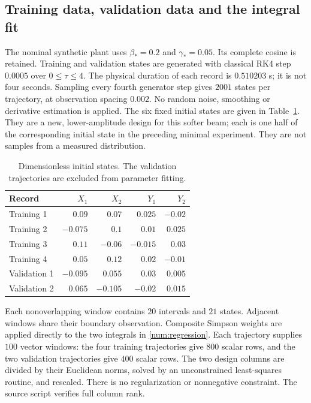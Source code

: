 \subsection{Training data, validation data and the integral fit}
\label{sx:training}
The nominal synthetic plant uses $\beta_*=0.2$ and $\gamma_*=0.05$.
Its complete cosine is retained. Training and validation states are
generated with classical RK4 step $0.0005$ over $0\leq\tau\leq4$.
The physical duration of each record is $0.510203$ s;
it is not four seconds. Sampling every fourth generator step gives
$2001$ states per trajectory, at observation spacing $0.002$.
No random noise, smoothing or derivative estimation is applied.
The six fixed initial states are given in Table~\ref{sx:initial-states}.
They are a new, lower-amplitude design for this softer beam; each is
one half of the corresponding initial state in the preceding minimal
experiment. They are not samples from a measured distribution.

\begin{table}[t]
\centering
\caption{Dimensionless initial states. The validation trajectories
are excluded from parameter fitting.}
\label{sx:initial-states}
\setlength{\tabcolsep}{3.3pt}
\begin{tabular}{lrrrr}
\toprule
Record & $X_1$ & $X_2$ & $Y_1$ & $Y_2$\\
\midrule
Training 1 & $0.09$ & $0.07$ & $0.025$ & $-0.02$ \\
Training 2 & $-0.075$ & $0.1$ & $0.01$ & $0.025$ \\
Training 3 & $0.11$ & $-0.06$ & $-0.015$ & $0.03$ \\
Training 4 & $0.05$ & $0.12$ & $0.02$ & $-0.01$ \\
Validation 1 & $-0.095$ & $0.055$ & $0.03$ & $0.005$ \\
Validation 2 & $0.065$ & $-0.105$ & $-0.02$ & $0.015$ \\
\bottomrule
\end{tabular}
\end{table}

Each nonoverlapping window contains $20$ intervals and $21$ states.
Adjacent windows share their boundary observation. Composite Simpson
weights are applied directly to the two integrals in
\eqref{num:regression}. Each trajectory supplies $100$ vector windows:
the four training trajectories give $800$ scalar rows, and the two
validation trajectories give $400$ scalar rows. The two design columns
are divided by their Euclidean norms, solved by an unconstrained
least-squares routine, and rescaled. There is no regularization or
nonnegative constraint. The source script verifies full column rank.

